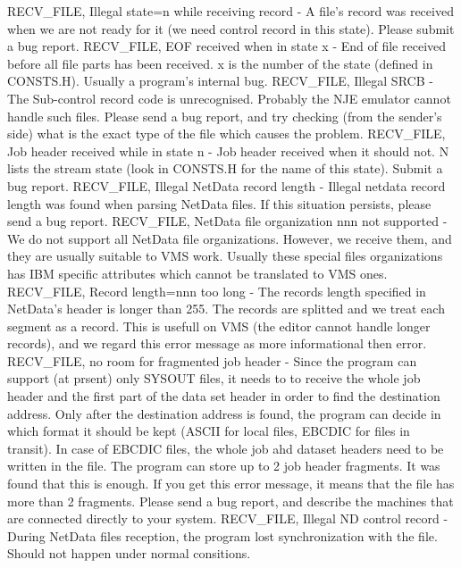 \hfill\break
{\ncrBold RECV\_FILE, Illegal state=n while receiving record }
- A file's record  was
received  when  we  are not ready for it (we need control record in this
state). Please submit a bug report.
\hfill\break
{\ncrBold RECV\_FILE, EOF received when in state x }
- End of  file  received  before
all  file parts has been received. x is the number of the state (defined
in CONSTS.H). Usually a program's internal bug.
\hfill\break
{\ncrBold RECV\_FILE, Illegal SRCB }
- The Sub-control record code  is  unrecognised.
Probably  the  NJE  emulator cannot handle such files. Please send a bug
report, and try checking (from the sender's side) what is the exact type
of the file which causes the problem.
\hfill\break
{\ncrBold RECV\_FILE,  Job  header  received while in state n }
- Job header received
when it should not. N lists the stream state (look in CONSTS.H  for  the
name of this state). Submit a bug report.
\hfill\break
{\ncrBold RECV\_FILE, Illegal NetData record length }
- Illegal netdata record length
was found when parsing NetData files. If this situation persists, please
send a bug report.
\hfill\break
{\ncrBold RECV\_FILE,  NetData  file  organization  nnn  not  supported }
- We do not
support all NetData file organizations. However, we  receive  them,  and
they  are  usually  suitable  to  VMS  work. Usually these special files
organizations has IBM specific attributes which cannot be translated  to
VMS ones.
\hfill\break
{\ncrBold RECV\_FILE,  Record length=nnn too long }
- The records length specified in
NetData's header is longer than 255. The records  are  splitted  and  we
treat  each  segment  as  a  record.  This is usefull on VMS (the editor
cannot handle longer records), and we regard this error message as  more
informational then error.
\hfill\break
{\ncrBold RECV\_FILE,  no  room  for  fragmented job header }
- Since the program can
support (at prsent) only SYSOUT files, it needs to to receive the  whole
job  header  and  the first part of the data set header in order to find
the destination address. Only after the destination  address  is  found,
the  program  can  decide  in  which format it should be kept (ASCII for
local files, EBCDIC for files in transit). In case of EBCDIC files,  the
whole  job  ahd  dataset  headers  need  to  be written in the file. The
program can store up to 2 job header fragments. It was found  that  this
is  enough.  If  you  get this error message, it means that the file has
more than 2 fragments. Please  send  a  bug  report,  and  describe  the
machines that are connected directly to your system.
\hfill\break
{\ncrBold RECV\_FILE,  Illegal  ND control record }
- During NetData files reception,
the program lost synchronization with the file. Should not happen  under
normal consitions.

